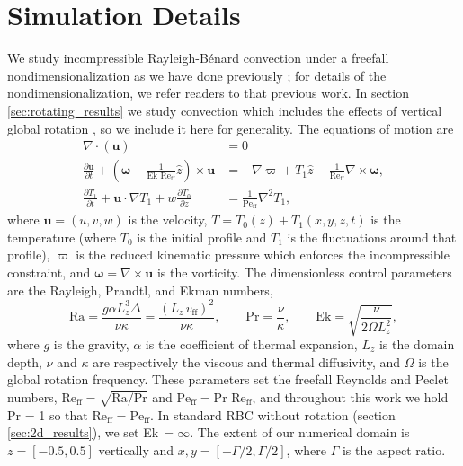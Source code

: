 \documentclass[aps, pre, onecolumn, nofootinbib, notitlepage, groupedaddress, amsfonts, amssymb, amsmath, longbibliography]{revtex4-1}
\newcommand{\Div}[1]{\ensuremath{\nabla\cdot\left( #1\right)}}
\newcommand{\grad}{\ensuremath{\nabla}}
\newcommand{\RB}{Rayleigh-B\'{e}nard }
\newcommand{\Reff}{\ensuremath{\text{Re}_{\text{ff}}}}
\newcommand{\Peff}{\ensuremath{\text{Pe}_{\text{ff}}}}
\begin{document}

\section{Simulation Details}
\label{sec:simulations}
We study incompressible \RB convection under a freefall nondimensionalization as we have done previously \cite{anders&all2018}; for details of the nondimensionalization, we refer readers to that previous work.
In section \ref{sec:rotating_results} we study convection which includes the effects of vertical global rotation \cite{julien&all1996}, so we include it here for generality.
The equations of motion are
\begin{align}
\Div{\bm{u}} &= 0
	\label{eqn:incompressible}
\\
\frac{\partial \bm{u}}{\partial t} + \left(\bm{\omega} + \frac{1}{\text{Ek }\Reff}\hat{z}\right)\times\bm{u} 
&= - \grad \varpi + T_1\hat{z} - \frac{1}{\Reff}\grad\times\bm{\omega},
	\label{eqn:bouss_momentum}
\\
\frac{\partial T_1}{\partial t}  + \bm{u}\cdot\grad T_1 + w \frac{\partial T_0}{\partial z} 
&= \frac{1}{\Peff}\grad^2 T_1,
	\label{eqn:bouss_energy}
\end{align}
where $\bm{u} = (u, v, w)$ is the velocity, $T = T_0(z) + T_1(x, y, z, t)$ is the temperature (where $T_0$ is the initial profile and $T_1$ is the fluctuations around that profile), $\varpi$ is the reduced kinematic pressure \cite{anders&all2018} which enforces the incompressible constraint, and $\bm{\omega} = \grad \times \bm{u}$ is the vorticity.
The dimensionless control parameters are the Rayleigh, Prandtl, and Ekman numbers,
\begin{equation}
\text{Ra} = \frac{g \alpha L_z^3 \Delta}{\nu\kappa} = \frac{(L_z\,v_{\text{ff}})^2}{\nu\kappa}, \qquad \text{Pr} = \frac{\nu}{\kappa}, \qquad \text{Ek} = \sqrt{\frac{\nu}{2\Omega L_z^2}},
\end{equation}
where $g$ is the gravity, $\alpha$ is the coefficient of thermal expansion, $L_z$ is the domain depth, $\nu$ and $\kappa$ are respectively the viscous and thermal diffusivity, and $\Omega$ is the global rotation frequency.
These parameters set the freefall Reynolds and Peclet numbers, $\Reff = \sqrt{\text{Ra}/\text{Pr}}$ and $\Peff = \text{Pr }\Reff$, and throughout this work we hold Pr = 1 so that $\Reff = \Peff$.
In standard RBC without rotation (section \ref{sec:2d_results}), we set Ek$\,= \infty$.
The extent of our numerical domain is $z = [-0.5, 0.5]$ vertically and $x, y = [-\Gamma/2, \Gamma/2]$, where $\Gamma$ is the aspect ratio.
\end{document}
